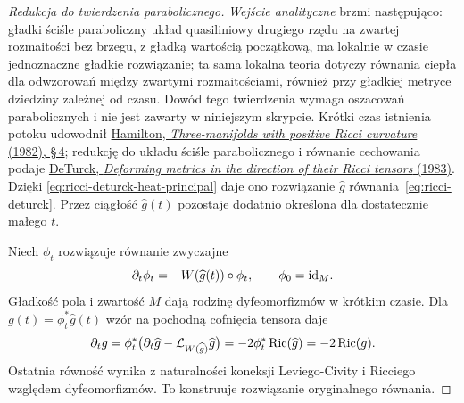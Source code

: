 \begin{proof}[Redukcja do twierdzenia parabolicznego]
\emph{Wejście analityczne} brzmi następująco: gładki
ściśle paraboliczny układ quasiliniowy drugiego rzędu
na zwartej rozmaitości bez brzegu, z gładką wartością
początkową, ma lokalnie w czasie jednoznaczne gładkie
rozwiązanie; ta sama lokalna teoria dotyczy równania
ciepła dla odwzorowań między zwartymi rozmaitościami,
również przy gładkiej metryce dziedziny zależnej od czasu.
Dowód tego twierdzenia wymaga oszacowań parabolicznych
i nie jest zawarty w niniejszym skrypcie. Krótki czas
istnienia potoku udowodnił
\href{https://projecteuclid.org/journals/journal-of-differential-geometry/volume-17/issue-2/Three-manifolds-with-positive-Ricci-curvature/10.4310/jdg/1214436922.full}
{Hamilton, \emph{Three-manifolds with positive Ricci
curvature} (1982), \S\,4}; redukcję do układu ściśle
parabolicznego i równanie cechowania podaje
\href{https://projecteuclid.org/journals/journal-of-differential-geometry/volume-18/issue-1/Deforming-metrics-in-the-direction-of-their-Ricci-tensors/10.4310/jdg/1214509286.full}
{DeTurck, \emph{Deforming metrics in the direction
of their Ricci tensors} (1983)}. Dzięki
\eqref{eq:ricci-deturck-heat-principal} daje ono
rozwiązanie $\widehat g$ równania~\eqref{eq:ricci-deturck}.
Przez ciągłość $\widehat g(t)$ pozostaje dodatnio
określona dla dostatecznie małego $t$.

Niech $\phi_t$ rozwiązuje równanie zwyczajne
\[
 \partial_t\phi_t=-W(\widehat g(t))\circ\phi_t,
 \qquad \phi_0=\mathrm{id}_M.
\]
Gładkość pola i zwartość $M$ dają rodzinę
dyfeomorfizmów w krótkim czasie. Dla
$g(t)=\phi_t^*\widehat g(t)$ wzór na pochodną
cofnięcia tensora daje
\[
 \partial_tg
 =\phi_t^*\bigl(\partial_t\widehat g
                  -\mathcal L_{W(\widehat g)}\widehat g\bigr)
 =-2\phi_t^*\operatorname{Ric}(\widehat g)
 =-2\operatorname{Ric}(g).
\]
Ostatnia równość wynika z naturalności koneksji
Leviego-Civity i Ricciego względem dyfeomorfizmów.
To konstruuje rozwiązanie oryginalnego równania.


\end{proof}
